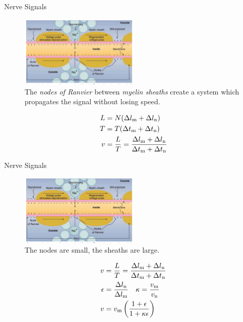 \documentclass{beamer}
\begin{document}
\begin{frame}{Nerve Signals}
\begin{figure}
\centering
\includegraphics[width=0.5\textwidth]{figures/nerve5.png}
\caption{\label{fig:nerve4a} The \textit{nodes of Ranvier} between \textit{myelin sheaths} create a system which propagates the signal without losing speed.}
\end{figure}
\small
\begin{align}
L &= N(\Delta l_{\rm m} + \Delta l_{\rm n}) \\
T &= T(\Delta t_{\rm m} + \Delta t_{\rm n}) \\ 
v &= \frac{L}{T} = \frac{\Delta l_{\rm m} + \Delta l_{\rm n}}{\Delta t_{\rm m} + \Delta t_{\rm n}}
\end{align}
\end{frame}

\begin{frame}{Nerve Signals}
\begin{figure}
\centering
\includegraphics[width=0.5\textwidth]{figures/nerve5.png}
\caption{\label{fig:nerve4b} The nodes are small, the sheaths are large.}
\end{figure}
\small
\begin{align}
v &= \frac{L}{T} = \frac{\Delta l_{\rm m} + \Delta l_{\rm n}}{\Delta t_{\rm m} + \Delta t_{\rm n}} \\
\epsilon &= \frac{\Delta l_{\rm n}}{\Delta l_{\rm m}} ~~~ \kappa = \frac{v_{\rm m}}{v_{\rm n}} \\
v &= v_{\rm m} \left( \frac{1+\epsilon}{1+\kappa\epsilon} \right)
\end{align}
\end{frame}
\end{document}
